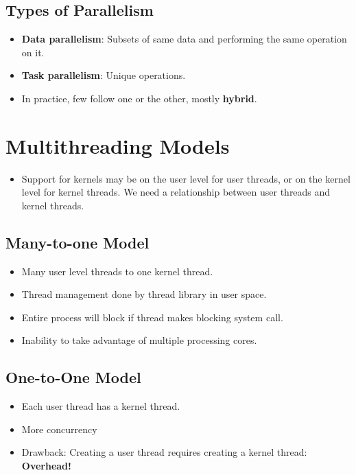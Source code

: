 \documentclass[10pt]{report}
\begin{document}
		\subsection{Types of Parallelism}
			\begin{itemize}
				\item \textbf{Data parallelism}: Subsets of same data and performing the same operation on it.
				\item \textbf{Task parallelism}: Unique operations.
				\item In practice, few follow one or the other, mostly \textbf{hybrid}.
			\end{itemize}

	\section{Multithreading Models}
		\begin{itemize}
			\item Support for kernels may be on the user level for user threads, or on the kernel level for kernel threads. We need a relationship between user threads and kernel threads.
		\end{itemize}

		\subsection{Many-to-one Model}
			\begin{itemize}
				\item Many user level threads to one kernel thread.
				\item Thread management done by thread library in user space.
				\item Entire process will block if thread makes blocking system call.
				\item Inability to take advantage of multiple processing cores.
			\end{itemize}

		\subsection{One-to-One Model}
			\begin{itemize}
				\item Each user thread has a kernel thread.
				\item More concurrency
				\item Drawback: Creating a user thread requires creating a kernel thread: \textbf{Overhead!}
			\end{itemize}
\end{document}
